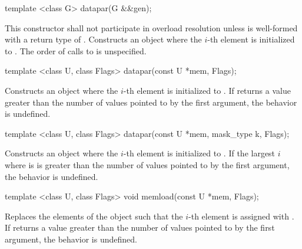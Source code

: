\begin{itemdecl}
template <class G> datapar(G &&gen);
\end{itemdecl}
\begin{itemdescr}
  \pnum\remarks This constructor shall not participate in overload resolution unless  is well-formed with a return type of .
  \pnum\effects Constructs an object where the $i$-th element is initialized to .
  \pnum\remarks The order of calls to  is unspecified.
\end{itemdescr}

\begin{itemdecl}
template <class U, class Flags> datapar(const U *mem, Flags);
\end{itemdecl}
\begin{itemdescr}
  \pnum\effects Constructs an object where the $i$-th element is initialized to  \foralli.
  \pnum\remarks If  returns a value greater than the number of values pointed to by the first argument, the behavior is undefined.
\end{itemdescr}

\begin{itemdecl}
template <class U, class Flags> datapar(const U *mem, mask_type k, Flags);
\end{itemdecl}
\begin{itemdescr}
  \pnum\effects Constructs an object where the $i$-th element is initialized to  \foralli.
  \pnum\remarks If the largest $i$ where  is \true is greater than the number of values pointed to by the first argument, the behavior is undefined.
\end{itemdescr}

\begin{itemdecl}
template <class U, class Flags> void memload(const U *mem, Flags);
\end{itemdecl}
\begin{itemdescr}
  \pnum\effects Replaces the elements of the \datapar object such that the $i$-th element is assigned with  \foralli.
  \pnum\remarks If  returns a value greater than the number of values pointed to by the first argument, the behavior is undefined.
\end{itemdescr}


